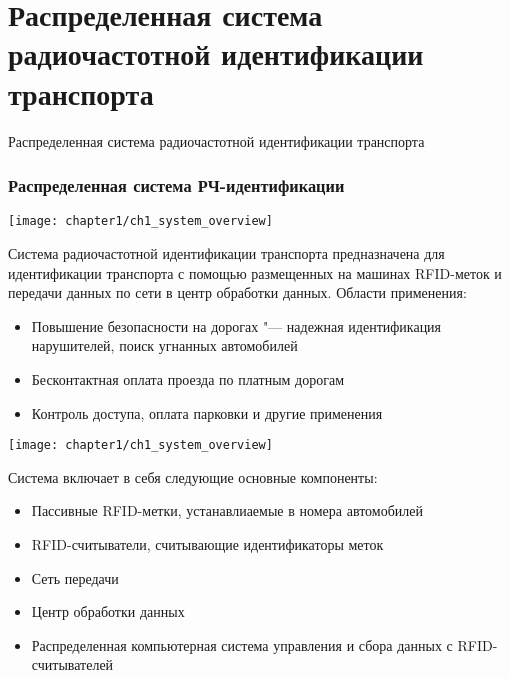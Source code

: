 \section{Распределенная система радиочастотной идентификации транспорта}
\begin{frame}
    \begin{center}
        \Huge
        Распределенная система радиочастотной идентификации транспорта
    \end{center}
\end{frame}

\begin{frame}[allowframebreaks]
    \frametitle{Распределенная система РЧ-идентификации}
    \begin{center}
        \texttt{[image: chapter1/ch1\_system\_overview]}
    \end{center}
    Система радиочастотной идентификации транспорта предназначена для
    идентификации транспорта с помощью размещенных на машинах RFID-меток
    и передачи данных по сети в центр обработки данных. Области применения:
    \begin{itemize}
        \item Повышение безопасности на дорогах "--- надежная идентификация нарушителей, поиск угнанных автомобилей
        \item Бесконтактная оплата проезда по платным дорогам
        \item Контроль доступа, оплата парковки и другие применения
    \end{itemize}
    \vfill
    \framebreak
    \begin{center}
        \texttt{[image: chapter1/ch1\_system\_overview]}
    \end{center}
    Система включает в себя следующие основные компоненты:
    \begin{itemize}
        \item Пассивные RFID-метки, устанавлиаемые в номера автомобилей
        \item RFID-считыватели, считывающие идентификаторы меток
        \item Сеть передачи
        \item Центр обработки данных
        \item Распределенная компьютерная система управления и сбора данных с RFID-считывателей
    \end{itemize}
\end{frame}

